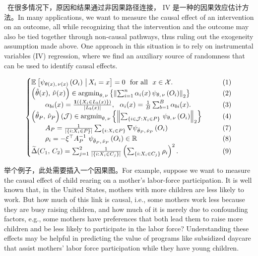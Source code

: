 \documentclass[aos]{imsart}
\theoremstyle{plain}
\theoremstyle{definition}
\theoremstyle{remark}
\begin{document}
\begin{CJK}{UTF8}{gbsn}
\, 在很多情况下，原因和结果通过非因果路径连接， IV 是一种的因果效应估计方法。In many applications, we want to measure the causal effect of an intervention on an outcome, all while recognizing that the intervention and the outcome may also be tied together through non-causal pathways, thus ruling out the exogeneity assumption made above. One approach in this situation is to rely on instrumental variables (IV) regression, where we find an auxiliary source of randomness that can be used to identify causal effects.


\begin{equation*}
\begin{cases}
\EE{\psi_{\theta(x), \, \nu(x)}\p{O_i} \cond X_i = x} = 0 \ \text{ for all } \ x \in \xx. &\qquad (1) \\
\p{\htheta(x), \, \hnu(x)} \in \argmin_{\theta, \, \nu} \cb{\Norm{\sum_{i = 1}^n \alpha_i(x) \, \psi_{\theta, \, \nu}\p{O_i}}_2} &\qquad (2) \\
\qquad  \alpha_{bi}(x) = \frac{\1\p{\cb{X_i \in L_b(x)}}}{\abs{L_b(x)}}, \ \ \alpha_i(x) = \frac{1}{B} \sum_{b = 1}^B \alpha_{bi}(x).  &\qquad (3) \\
\p{\htheta_P, \, \hnu_P}(\mathcal{J}) \in \argmin_{\theta, \, \nu} \cb{\Norm{\sum_{\cb{i\in\mathcal{J} : X_i \in P}} \, \psi_{\theta, \, \nu}\p{O_i}}_2}   &\qquad (4) \\
\qquad A_P = \frac{1}{\abs{\cb{i : X_i \in P}}} \sum_{\cb{i : X_i \in P}} \nabla \psi_{\htheta_P, \, \hnu_P}\p{O_i} &\qquad (7) \\
\qquad  \rho_i = -\xi^\top A_P^{-1} \ \psi_{\htheta_P, \, \hnu_P}\p{O_i} \in \RR &\qquad (8) \\
\tDelta(C_1, \, C_2) =  \sum_{j = 1}^2\frac{1}{\abs{\cb{i : X_i \in C_j}}}\p{ \sum_{\cb{i : X_i \in C_j}} \rho_i}^2. &\qquad (9)
\end{cases}
\end{equation*}

举个例子，此处需要插入一个因果图。For example, suppose we want to measure the causal effect of child rearing on
a mother's labor-force participation. It is well known that, in the United States, mothers with more children are
less likely to work. But how much of this link is causal, i.e., some mothers work less because they
are busy raising children, and how much of it is merely due to confounding factors, e.g., some mothers have
preferences that both lead them to raise more children and be less likely to participate in the
labor force? Understanding these effects may be helpful in predicting the value of programs
like subsidized daycare that assist mothers' labor force participation while they have young children.


\end{CJK}
\end{document}
